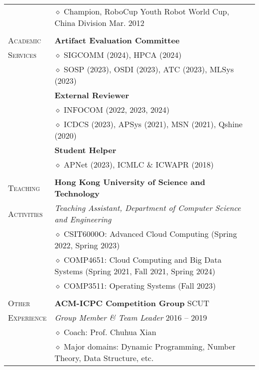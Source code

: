 \documentclass[letterpaper, 10pt]{article}
\begin{document}
\begin{longtable}{p{0.7in}p{6.0in}}
& $\diamond$ Champion, RoboCup Youth Robot World Cup, China Division \hfill Mar. 2012 \\

& \\

{\textsc{Academic}}
& \textbf{Artifact Evaluation Committee} \\
{\textsc{Services}}
& $\diamond$ SIGCOMM (2024), HPCA (2024) \\
& $\diamond$ SOSP (2023), OSDI (2023), ATC (2023), MLSys (2023) \\
& \textbf{External Reviewer} \\
& $\diamond$ INFOCOM (2022, 2023, 2024) \\
& $\diamond$ ICDCS (2023), APSys (2021), MSN (2021), Qshine (2020) \\
& \textbf{Student Helper} \\
& $\diamond$ APNet (2023), ICMLC \& ICWAPR (2018) \\
& \\

{\textsc{Teaching }}
& \textbf{Hong Kong University of Science and Technology} \\
{\textsc{Activities}}
& \textit{Teaching Assistant, Department of Computer Science and Engineering} \\
& $\diamond$ CSIT6000O: Advanced Cloud Computing (Spring 2022, Spring 2023) \\
& $\diamond$ COMP4651: Cloud Computing and Big Data Systems (Spring 2021, Fall 2021, Spring 2024) \\
& $\diamond$ COMP3511: Operating Systems (Fall 2023) \\
& \\

{\textsc{Other}}
& \textbf{ACM-ICPC Competition Group} \hfill SCUT \\
{\textsc{Experience}}
& \textit{Group Member \& Team Leader} \hfill 2016 -- 2019 \\
& $\diamond$ Coach: Prof. Chuhua Xian \\
& $\diamond$ Major domains: Dynamic Programming, Number Theory, Data Structure, etc. \\


\end{longtable}
\end{document}
